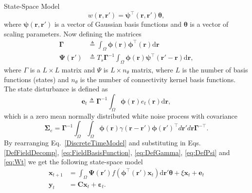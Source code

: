 \documentclass[final]{beamer}
\newlength{\onecolwid}
\begin{document}
\begin{frame}[t]
\begin{columns}[t]
\begin{column}{\onecolwid}
\begin{block}{State-Space Model}
{\begin{equation}
		 w\left(\mathbf{r},\mathbf{r}'\right) =\boldsymbol{\psi}^\top\left(\mathbf{r},\mathbf{r}'\right) \boldsymbol{\theta},
	\end{equation}
	where $\boldsymbol{\psi}(\mathbf{r},\mathbf{r}')$ is a vector of Gaussian basis functions and $\boldsymbol{\theta}$ is a vector of scaling parameters. Now defining the matrices
	\begin{align}
		\boldsymbol{\Gamma} &\triangleq \int_\Omega {\boldsymbol{\phi} \left(\mathbf{r}\right)\boldsymbol{\phi} ^{\top}\left(\mathbf{r}\right)\textrm{d}\mathbf{r}} \label{eq:DefGamma} \\ 
		\boldsymbol{\Psi}(\mathbf{r}') &\triangleq T_s\boldsymbol{\Gamma}^{-1}\int_\Omega {\boldsymbol{\phi}(\mathbf{r})\boldsymbol{\psi}^{\top}\label{eq:DefPsi} (\mathbf{r}'-\mathbf{r})\textrm{d}\mathbf{r}},
	\end{align}
	where $\Gamma$ is a $L\times L$ matrix and $\Psi$ is $L \times n_{\theta}$ matrix, where $L$ is the number of basis functions (states) and $n_{\theta}$ is the number of connectivity kernel basis functions. The state disturbance is defined as
	\begin{equation}\label{eq:Wt} 
		\mathbf{e}_t \triangleq \boldsymbol{\Gamma}^{-1}\int_\Omega {\boldsymbol{\phi} ( \mathbf{r} )e_t( \mathbf{r} )\textrm{d}\mathbf{r}},
	\end{equation}
	which is a zero mean normally distributed white noise process with covariance
	\begin{equation}
		\boldsymbol\Sigma_e =\mathbf{\Gamma}^{-1}\int_{\Omega}\int_{\Omega}\boldsymbol{\phi}\left(\mathbf r\right) \gamma\left(\mathbf r- \mathbf r' \right)\boldsymbol{\phi}\left(\mathbf r'\right)^{\top}d\mathbf r' d\mathbf r\mathbf{\Gamma}^{- \top}. 
	\end{equation}
	By rearranging Eq.~\ref{DiscreteTimeModel} and substituting in Eqs. \ref{DefFieldDecomp}, \ref{eq:FieldBasisFunction}, \ref{eq:DefGamma}, \ref{eq:DefPsi} and \ref{eq:Wt} we get the following state-space model
	\begin{align}
		\mathbf{x}_{t+1} &= \int_\Omega \boldsymbol{\Psi}(\mathbf{r}') f(\boldsymbol{\phi}^{\top}(\mathbf{r}')\mathbf{x}_t) \textrm{d}\mathbf{r}' \boldsymbol{\theta} + \xi\mathbf{x}_t + \mathbf{e}_t \\
		\mathbf{y}_t &= \mathbf{C}\mathbf{x}_t + \boldsymbol{\varepsilon}_t.
		\end{align} 	
}
\end{block}
\end{column}
\end{columns}
\end{frame}
\end{document}
